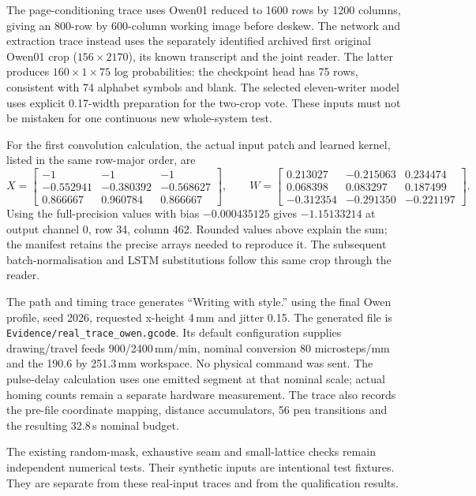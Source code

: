 The page-conditioning trace uses Owen01 reduced to 1600 rows by 1200 columns, giving an 800-row by 600-column working image before deskew. The network and extraction trace instead uses the separately identified archived first original Owen01 crop ($156\times2170$), its known transcript and the joint reader. The latter produces $160\times1\times75$ log probabilities: the checkpoint head has 75 rows, consistent with 74 alphabet symbols and blank. The selected eleven-writer model uses explicit 0.17-width preparation for the two-crop vote. These inputs must not be mistaken for one continuous new whole-system test.

For the first convolution calculation, the actual input patch and learned kernel, listed in the same row-major order, are
\[
X=\begin{bmatrix}-1&-1&-1\\-0.552941&-0.380392&-0.568627\\0.866667&0.960784&0.866667\end{bmatrix},\qquad
W=\begin{bmatrix}0.213027&-0.215063&0.234474\\0.068398&0.083297&0.187499\\-0.312354&-0.291350&-0.221197\end{bmatrix}.
\]
Using the full-precision values with bias $-0.000435125$ gives $-1.15133214$ at output channel 0, row 34, column 462. Rounded values above explain the sum; the manifest retains the precise arrays needed to reproduce it. The subsequent batch-normalisation and LSTM substitutions follow this same crop through the reader.

The path and timing trace generates ``Writing with style.'' using the final Owen profile, seed 2026, requested x-height 4\,mm and jitter 0.15. The generated file is \texttt{Evidence/real\_trace\_owen.gcode}. Its default configuration supplies drawing/travel feeds 900/2400\,mm/min, nominal conversion 80 microsteps/mm and the 190.6 by 251.3\,mm workspace. No physical command was sent. The pulse-delay calculation uses one emitted segment at that nominal scale; actual homing counts remain a separate hardware measurement. The trace also records the pre-file coordinate mapping, distance accumulators, 56 pen transitions and the resulting 32.8\,s nominal budget.

The existing random-mask, exhaustive seam and small-lattice checks remain independent numerical tests. Their synthetic inputs are intentional test fixtures. They are separate from these real-input traces and from the qualification results.
